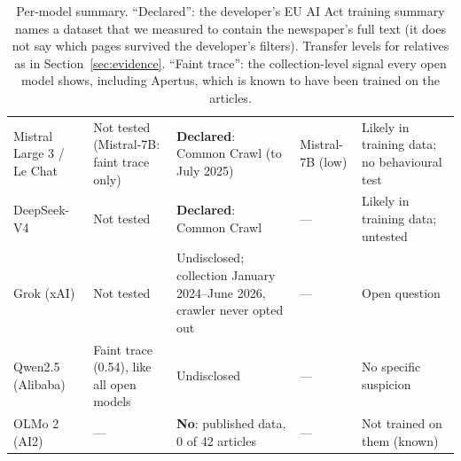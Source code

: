 \documentclass[10pt,a4paper]{article}
\begin{document}
\begin{table}[h]
\begin{tabularx}{\linewidth}{>{\raggedright\arraybackslash}p{2.0cm}>{\raggedright\arraybackslash}X>{\raggedright\arraybackslash}X>{\raggedright\arraybackslash}p{2.2cm}>{\raggedright\arraybackslash}p{1.9cm}}
Mistral Large 3 / Le Chat & Not tested (Mistral-7B: faint trace only) & \textbf{Declared}: Common Crawl (to July 2025)
& Mistral-7B (low) & Likely in training data; no behavioural test\\
DeepSeek-V4 & Not tested & \textbf{Declared}: Common Crawl & --- & Likely in training data; untested\\
Grok (xAI) & Not tested & Undisclosed; collection January 2024--June 2026, crawler never opted out & --- & Open
question\\
Qwen2.5 (Alibaba) & Faint trace (0.54), like all open models & Undisclosed & --- & No specific suspicion\\
OLMo 2 (AI2) & --- & \textbf{No}: published data, 0 of 42 articles & --- & Not trained on them (known)\\
\bottomrule
\end{tabularx}
\caption{Per-model summary. ``Declared'': the developer's EU AI Act training summary names a dataset that we measured to
contain the newspaper's full text (it does not say which pages survived the developer's filters). Transfer levels for
relatives as in Section~\ref{sec:evidence}. ``Faint trace'': the collection-level signal every open model shows,
including Apertus, which is known to have been trained on the articles.}\label{tab:verdicts}
\end{table}
\end{document}
